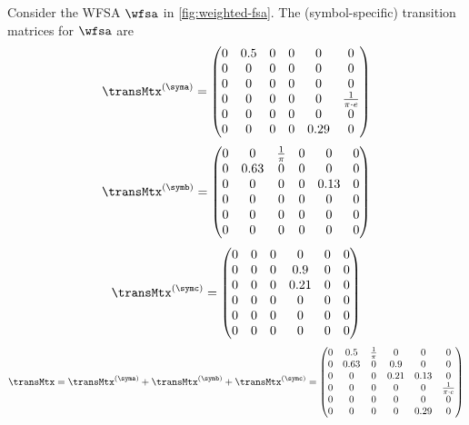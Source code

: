 \begin{example}
    Consider the WFSA $\wfsa$ in \cref{fig:weighted-fsa}. The (symbol-specific) transition matrices for $\wfsa$ are
    \begin{equation*}
        \transMtx^{\left(\syma\right)} = \begin{pmatrix}
        0 & 0.5 & 0 & 0 & 0 & 0 \\
        0 & 0 & 0 & 0 & 0 & 0 \\
        0 & 0 & 0 & 0 & 0 & 0 \\
        0 & 0 & 0 & 0 & 0 & \frac{1}{\pi \cdot e} \\
        0 & 0 & 0 & 0 & 0 & 0 \\
        0 & 0 & 0 & 0 & 0.29 & 0 \\
        \end{pmatrix}
    \end{equation*}
    \begin{equation*}
        \transMtx^{\left(\symb\right)} = \begin{pmatrix}
        0 & 0 & \frac{1}{\pi} & 0 & 0 & 0 \\
        0 & 0.63 & 0 & 0 & 0 & 0 \\
        0 & 0 & 0 & 0 & 0.13 & 0 \\
        0 & 0 & 0 & 0 & 0 & 0 \\
        0 & 0 & 0 & 0 & 0 & 0 \\
        0 & 0 & 0 & 0 & 0 & 0 \\
        \end{pmatrix}
    \end{equation*}
    \begin{equation*}
        \transMtx^{\left(\symc\right)} = \begin{pmatrix}
        0 & 0 & 0 & 0 & 0 & 0 \\
        0 & 0 & 0 & 0.9 & 0 & 0 \\
        0 & 0 & 0 & 0.21 & 0 & 0 \\
        0 & 0 & 0 & 0 & 0 & 0 \\
        0 & 0 & 0 & 0 & 0 & 0 \\
        0 & 0 & 0 & 0 & 0 & 0 \\
        \end{pmatrix}
    \end{equation*}
    \begin{equation*}
        \transMtx = \transMtx^{\left(\syma\right)} + \transMtx^{\left(\symb\right)}+ \transMtx^{\left(\symc\right)} = \begin{pmatrix}
        0 & 0.5 &  \frac{1}{\pi} & 0 & 0 & 0 \\
        0 & 0.63 & 0 & 0.9 & 0 & 0 \\
        0 & 0 & 0 & 0.21 & 0.13 & 0 \\
        0 & 0 & 0 & 0 & 0 & \frac{1}{\pi \cdot e} \\
        0 & 0 & 0 & 0 & 0 & 0 \\
        0 & 0 & 0 & 0 & 0.29 & 0 \\
        \end{pmatrix}
    \end{equation*}
\end{example}

